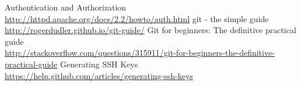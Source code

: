  Authentication and Authorization \\
\url{http://httpd.apache.org/docs/2.2/howto/auth.html}
 git - the simple guide \\
\url{http://rogerdudler.github.io/git-guide/}
 Git for beginners: The definitive practical guide \\
\url{http://stackoverflow.com/questions/315911/git-for-beginners-the-definitive-practical-guide}
 Generating SSH Keys \\
\url{https://help.github.com/articles/generating-ssh-keys}
